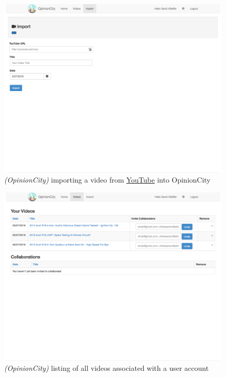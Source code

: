 \begin{figure}[ht]
	\includegraphics[width=\textwidth]{gfx/opinion-city/import1.pdf}
	\caption{\textit{(OpinionCity)} importing a video from \href{http://www.youtube.com}{YouTube} into OpinionCity} 
	\label{fig:opinioncity:importing-a-video-from-youtube}
\end{figure} 

\begin{figure}[ht]
	\includegraphics[width=\textwidth]{gfx/opinion-city/videolist1.pdf}
	\caption{\textit{(OpinionCity)} listing of all videos associated with a user account} 
	\label{fig:opinioncity:video-listing}
\end{figure}

